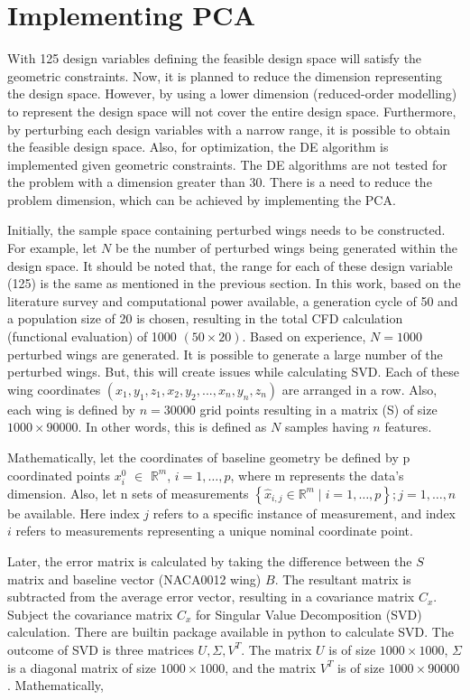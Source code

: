 \section{Implementing PCA}
With 125 design variables defining the feasible design space will satisfy the geometric constraints. Now, it is planned to reduce the dimension representing the design space. However, by using a lower dimension (reduced-order modelling) to represent the design space will not cover the entire design space. Furthermore, by perturbing each design variables with a narrow range, it is possible to obtain the feasible design space. Also, for optimization, the DE algorithm is implemented given geometric constraints. The DE algorithms are not tested for the problem with a dimension greater than 30. There is a need to reduce the problem dimension, which can be achieved by implementing the PCA. 

Initially, the sample space containing perturbed wings needs to be constructed. For example, let $N$ be the number of perturbed wings being generated within the design space. It should be noted that, the range for each of these design variable (125) is the same as mentioned in the previous section. In this work, based on the literature survey and computational power available, a generation cycle of 50 and a population size of 20 is chosen, resulting in the total CFD calculation (functional evaluation) of 1000 $(50 \times 20)$. Based on experience, $N=1000$ perturbed wings are generated. It is possible to generate a large number of the perturbed wings. But, this will create issues while calculating SVD. Each of these wing coordinates $(x_1, y_1, z_1, x_2, y_2, ...,x_n, y_n, z_n)$ are arranged in a row. Also, each wing is defined by $n=30000$ grid points resulting in a matrix (S) of size $1000 \times 90000$. In other words, this is defined as $N$ samples having $n$ features.

Mathematically, let the coordinates of baseline geometry be defined by p coordinated points $x_{i}^{0}$ $\in$ $\mathbb{R}^{m}$, $i=1, \ldots, p$,  where m represents the data's dimension. Also, let n sets of measurements 
$\left\{\hat{x}_{i, j} \in \mathbb{R}^{m} \mid i=1, \ldots, p\right\} ; j=1, \ldots, n$ be available. Here index $j$ refers to a specific instance of measurement, and index $i$ refers to measurements representing a unique nominal coordinate point.

Later, the error matrix is calculated by taking the difference between the $S$ matrix and baseline vector (NACA0012 wing) $B$. The resultant matrix is subtracted from the average error vector, resulting in a covariance matrix $C_x$. Subject the covariance matrix $C_x$ for Singular Value Decomposition (SVD) calculation. There are builtin package available in python to calculate SVD. The outcome of SVD is three matrices $U, \Sigma, V^T$. The matrix $U$ is of size $1000 \times 1000$, $\Sigma$ is a diagonal matrix of size $1000 \times 1000$, and the matrix $V^T$ is of size $1000 \times 90000$. Mathematically,

